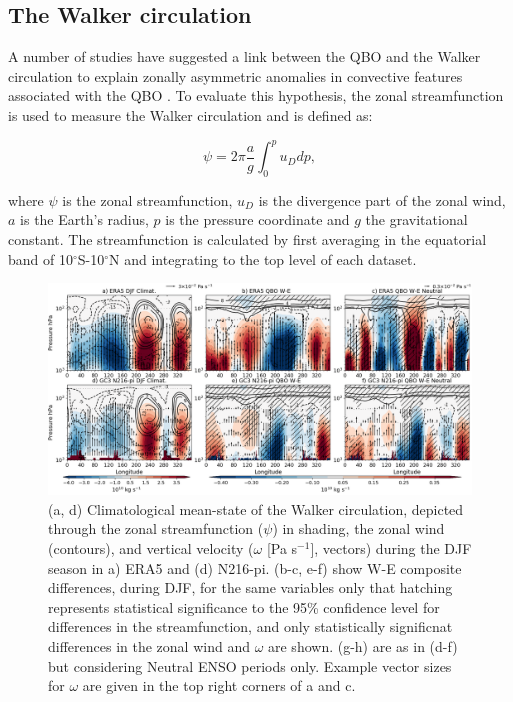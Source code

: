 \subsection{The Walker circulation}



A number of studies have suggested a link between the QBO and the Walker circulation to explain zonally asymmetric anomalies in convective features associated with the QBO \citep[e.g.][]{collimore2003,liess2012}. To evaluate this hypothesis, the zonal streamfunction is used to measure the Walker circulation \citep{yu2010,bayr2014} and is defined as:

\begin{equation}
\psi=2\pi \frac{a}{g} \int_0^p u_D dp,
\end{equation}

\noindent where $\psi$ is the zonal streamfunction, $u_D$ is the divergence part of the zonal wind, $a$ is the Earth's radius, $p$ is the pressure coordinate and $g$ the gravitational constant.
The streamfunction is calculated by first averaging in the equatorial band of 10$^\circ$S-10$^\circ$N and integrating to the top level of each dataset.

\begin{figure}[t!]
\centering
 \noindent
 \includegraphics[width=\linewidth]{figures/cmip_era5_streamdjf.png}
\caption[Walker circulation anomalies in DJF]{(a, d) Climatological mean-state of the Walker circulation, depicted through the zonal streamfunction ($\psi$) in shading, the zonal wind (contours), and vertical velocity ($\omega$ [Pa s$^{-1}$], vectors) during the DJF season in a) ERA5 and (d) N216-pi. (b-c, e-f) show W-E composite differences, during DJF, for the same variables only that hatching represents statistical significance to the 95\% confidence level for differences in the streamfunction, and only statistically significnat differences in the zonal wind and $\omega$ are shown. (g-h) are as in (d-f) but considering Neutral ENSO periods only. Example vector sizes for $\omega$ are given in the top right corners of a and c.}
\label{fig:walker_djfm}
\end{figure}

